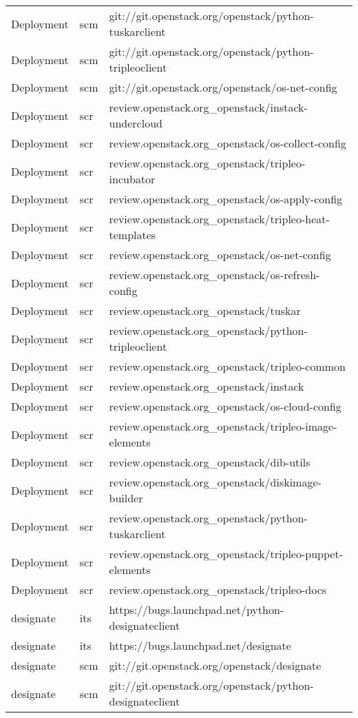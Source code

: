 \begin{center}
\begin{longtable}{|p{4cm}|p{1cm}|p{10cm}|}
Deployment&scm&git://git.openstack.org/openstack/python-tuskarclient\\ 
Deployment&scm&git://git.openstack.org/openstack/python-tripleoclient\\ 
Deployment&scm&git://git.openstack.org/openstack/os-net-config\\ 
Deployment&scr&review.openstack.org\_openstack/instack-undercloud\\ 
Deployment&scr&review.openstack.org\_openstack/os-collect-config\\ 
Deployment&scr&review.openstack.org\_openstack/tripleo-incubator\\ 
Deployment&scr&review.openstack.org\_openstack/os-apply-config\\ 
Deployment&scr&review.openstack.org\_openstack/tripleo-heat-templates\\ 
Deployment&scr&review.openstack.org\_openstack/os-net-config\\ 
Deployment&scr&review.openstack.org\_openstack/os-refresh-config\\ 
Deployment&scr&review.openstack.org\_openstack/tuskar\\ 
Deployment&scr&review.openstack.org\_openstack/python-tripleoclient\\ 
Deployment&scr&review.openstack.org\_openstack/tripleo-common\\ 
Deployment&scr&review.openstack.org\_openstack/instack\\ 
Deployment&scr&review.openstack.org\_openstack/os-cloud-config\\ 
Deployment&scr&review.openstack.org\_openstack/tripleo-image-elements\\ 
Deployment&scr&review.openstack.org\_openstack/dib-utils\\ 
Deployment&scr&review.openstack.org\_openstack/diskimage-builder\\ 
Deployment&scr&review.openstack.org\_openstack/python-tuskarclient\\ 
Deployment&scr&review.openstack.org\_openstack/tripleo-puppet-elements\\ 
Deployment&scr&review.openstack.org\_openstack/tripleo-docs\\ 
designate&its&https://bugs.launchpad.net/python-designateclient\\ 
designate&its&https://bugs.launchpad.net/designate\\ 
designate&scm&git://git.openstack.org/openstack/designate\\ 
designate&scm&git://git.openstack.org/openstack/python-designateclient\\ 

\end{longtable}
\end{center}
